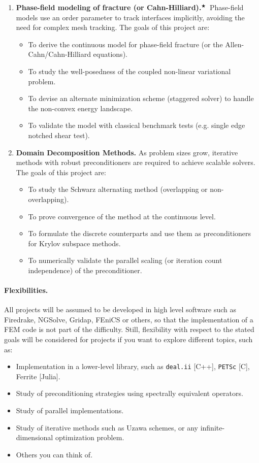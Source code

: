 \documentclass{article}
\newcommand{\master}{$^\bigstar$}
\begin{document}
\begin{enumerate}
    \item \textbf{Phase-field modeling of fracture (or Cahn-Hilliard).}\master\ Phase-field models use an order parameter to track interfaces implicitly, avoiding the need for complex mesh tracking. The goals of this project are:
        \begin{itemize}
            \item To derive the continuous model for phase-field fracture (or the Allen-Cahn/Cahn-Hilliard equations).
            \item To study the well-posedness of the coupled non-linear variational problem.
            \item To devise an alternate minimization scheme (staggered solver) to handle the non-convex energy landscape.
            \item To validate the model with classical benchmark tests (e.g. single edge notched shear test).
        \end{itemize}

    \item \textbf{Domain Decomposition Methods.} As problem sizes grow, iterative methods with robust preconditioners are required to achieve scalable solvers. The goals of this project are:
        \begin{itemize}
            \item To study the Schwarz alternating method (overlapping or non-overlapping).
            \item To prove convergence of the method at the continuous level.
            \item To formulate the discrete counterparts and use them as preconditioners for Krylov subspace methods.
            \item To numerically validate the parallel scaling (or iteration count independence) of the preconditioner.
        \end{itemize}
\end{enumerate}

\paragraph{\textbf{Flexibilities.}} All projects will be assumed to be developed in high level software such as Firedrake, NGSolve, Gridap, FEniCS or others, so that the implementation of a FEM code is not part of the difficulty. Still, flexibility with respect to the stated goals will be considered for projects if you want to explore different topics, such as: 
\begin{itemize}
    \item Implementation in a lower-level library, such as \texttt{deal.ii} [C++], \texttt{PETSc} [C], Ferrite [Julia].
    \item Study of preconditioning strategies using spectrally equivalent operators.
    \item Study of parallel implementations.
    \item Study of iterative methods such as Uzawa schemes, or any infinite-dimensional optimization problem.
    \item Others you can think of.
\end{itemize}
\end{document}
